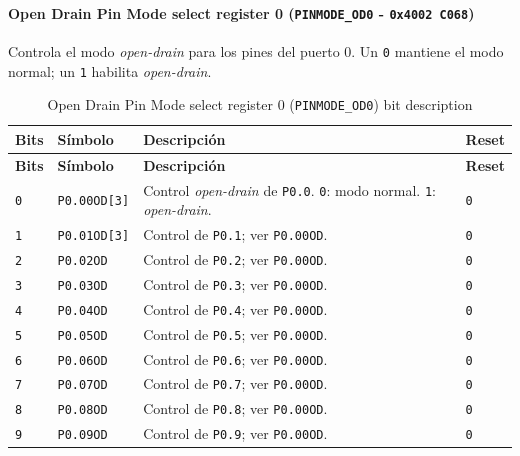 \paragraph{Open Drain Pin Mode select register 0 (\texttt{PINMODE\_OD0} - \texttt{0x4002 C068})}
Controla el modo \textit{open-drain} para los pines del puerto 0. Un \texttt{0} mantiene el modo normal; un \texttt{1} habilita \textit{open-drain}.

\begin{longtable}{|>{\raggedright\arraybackslash}p{}|>{\raggedright\arraybackslash}p{}|>{\raggedright\arraybackslash}p{}|>{\centering\arraybackslash}p{}|}
\caption{Open Drain Pin Mode select register 0 (\texttt{PINMODE\_OD0}) bit description}\\
\hline
\textbf{Bits} & \textbf{Símbolo} & \textbf{Descripción} & \textbf{Reset} \\
\hline
\endfirsthead
\hline
\textbf{Bits} & \textbf{Símbolo} & \textbf{Descripción} & \textbf{Reset} \\
\hline
\endhead
\texttt{0} & \texttt{P0.00OD[3]} & Control \textit{open-drain} de \texttt{P0.0}. \texttt{0}: modo normal. \texttt{1}: \textit{open-drain}. & \texttt{0} \\
\hline
\texttt{1} & \texttt{P0.01OD[3]} & Control de \texttt{P0.1}; ver \texttt{P0.00OD}. & \texttt{0} \\
\hline
\texttt{2} & \texttt{P0.02OD} & Control de \texttt{P0.2}; ver \texttt{P0.00OD}. & \texttt{0} \\
\hline
\texttt{3} & \texttt{P0.03OD} & Control de \texttt{P0.3}; ver \texttt{P0.00OD}. & \texttt{0} \\
\hline
\texttt{4} & \texttt{P0.04OD} & Control de \texttt{P0.4}; ver \texttt{P0.00OD}. & \texttt{0} \\
\hline
\texttt{5} & \texttt{P0.05OD} & Control de \texttt{P0.5}; ver \texttt{P0.00OD}. & \texttt{0} \\
\hline
\texttt{6} & \texttt{P0.06OD} & Control de \texttt{P0.6}; ver \texttt{P0.00OD}. & \texttt{0} \\
\hline
\texttt{7} & \texttt{P0.07OD} & Control de \texttt{P0.7}; ver \texttt{P0.00OD}. & \texttt{0} \\
\hline
\texttt{8} & \texttt{P0.08OD} & Control de \texttt{P0.8}; ver \texttt{P0.00OD}. & \texttt{0} \\
\hline
\texttt{9} & \texttt{P0.09OD} & Control de \texttt{P0.9}; ver \texttt{P0.00OD}. & \texttt{0} \\
\hline

\end{longtable}
